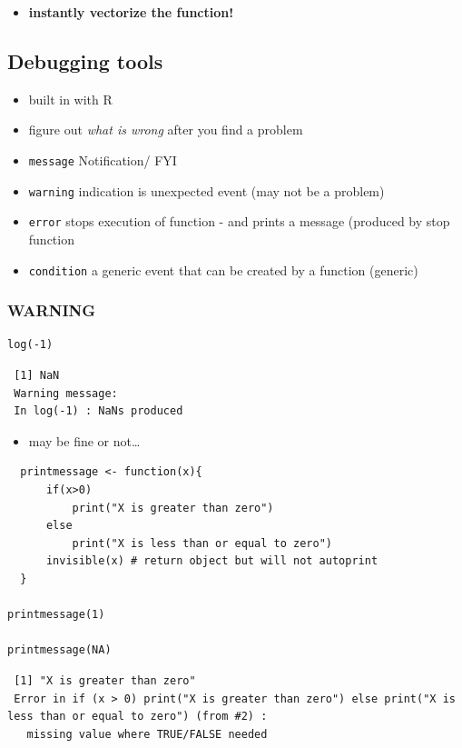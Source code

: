 \documentclass[11pt]{article}
\begin{document}
\begin{itemize}
\item \textbf{instantly vectorize the function!}
\end{itemize}
\subsection{Debugging tools}
\label{sec-2-5}

\begin{itemize}
\item built in with R
\item figure out \emph{what is wrong} after you find a problem
\item \texttt{message} Notification/ FYI
\item \texttt{warning} indication is unexpected event (may not be a problem)
\item \texttt{error} stops execution of function - and prints a message
  (produced by stop function
\item \texttt{condition} a generic event that can be created by a function
  (generic)
\end{itemize}
\subsubsection{WARNING}
\label{sec-2-5-1}


\begin{verbatim}
log(-1)
\end{verbatim}

\begin{verbatim}
 [1] NaN
 Warning message:
 In log(-1) : NaNs produced
\end{verbatim}

\begin{itemize}
\item may be fine or not\ldots{}
\end{itemize}


\begin{verbatim}
  printmessage <- function(x){
      if(x>0)
          print("X is greater than zero")
      else
          print("X is less than or equal to zero")
      invisible(x) # return object but will not autoprint
  }

printmessage(1)

printmessage(NA)
\end{verbatim}

\begin{verbatim}
 [1] "X is greater than zero"
 Error in if (x > 0) print("X is greater than zero") else print("X is less than or equal to zero") (from #2) : 
   missing value where TRUE/FALSE needed
\end{verbatim}
\end{document}

